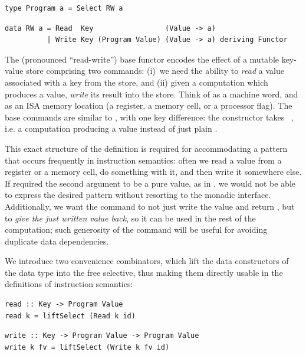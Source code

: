 \vspace{1mm}
\begin{verbatim}
type Program a = Select RW a
\end{verbatim}
\vspace{-0.5mm}
\begin{verbatim}
data RW a = Read  Key                 (Value -> a)
          | Write Key (Program Value) (Value -> a) deriving Functor
\end{verbatim}
\vspace{1mm}

\noindent
The  (pronounced ``read-write'') base functor encodes the effect of a
mutable key-value store comprising two commands: (i)~we need the ability to
\emph{read} a value associated with a key from the store, and (ii) given a
computation which produces a value, \emph{write} its result into the store.
Think of  as a machine word, and  as an ISA memory location
(a register, a memory cell, or a processor flag). The base commands are similar
to , with one key difference: the  constructor takes
~, i.e. a computation producing a value instead of just
plain .

This exact structure of the definition is required for accommodating a pattern
that occurs frequently in instruction semantics: often we read a value from a
register or a memory cell, do something with it, and then write it somewhere
else. If  required the second argument to be a pure value, as in
, we would not be able to express the desired pattern without
resorting to the monadic interface. Additionally, we want the 
command to not just write the value and return \hs{()}, but to \emph{give the
just written value back}, so it can be used in the rest of the computation; such
generosity of the  command will be useful for avoiding duplicate data
dependencies.

We introduce two convenience combinators, which lift the data constructors of
the  data type into the free selective, thus making them directly usable
in the definitions of instruction semantics:

\vspace{1mm}
\begin{verbatim}
read :: Key -> Program Value
read k = liftSelect (Read k id)
\end{verbatim}
\vspace{-0.5mm}
\begin{verbatim}
write :: Key -> Program Value -> Program Value
write k fv = liftSelect (Write k fv id)
\end{verbatim}
\vspace{1mm}

